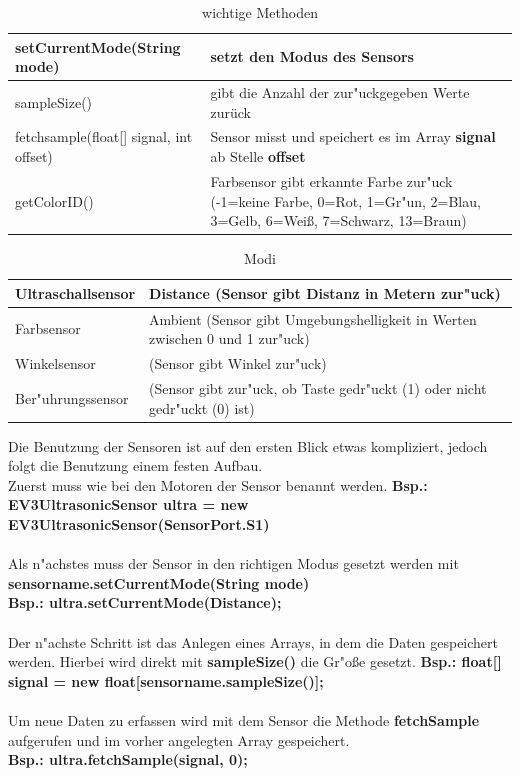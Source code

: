 \begin{table}[H]
	\begin{tabular}{|p{}| p{}|}
		\hline
		setCurrentMode\newline (String mode)& setzt den Modus des Sensors \\ \hline 
		sampleSize() &  gibt die Anzahl der zur"uckgegeben Werte zurück\\ \hline 
		fetchsample(float[] signal, int offset) & Sensor misst und speichert es im Array \textbf{signal} ab Stelle \textbf{offset}\\ \hline
		getColorID() &  Farbsensor gibt erkannte Farbe zur"uck (-1=keine Farbe, 0=Rot, 1=Gr"un, 2=Blau, 3=Gelb, 6=Wei\ss{}, 7=Schwarz, 13=Braun)\\ \hline 
	\end{tabular}
	\caption{wichtige Methoden}
\end{table}

\begin{table}[H]
	\begin{tabular}{|p{}| p{}|}
		\hline
		Ultraschallsensor& Distance (Sensor gibt Distanz in Metern zur"uck) \\ \hline 
		Farbsensor &  Ambient (Sensor gibt Umgebungshelligkeit in Werten zwischen 0 und 1 zur"uck)\\ \hline 
		Winkelsensor& (Sensor gibt Winkel zur"uck)\\ \hline
		Ber"uhrungssensor& (Sensor gibt zur"uck, ob Taste gedr"uckt (1) oder nicht gedr"uckt (0) ist)\\ \hline
	\end{tabular}
	\caption{Modi}
\end{table}

Die Benutzung der Sensoren ist auf den ersten Blick etwas kompliziert, jedoch folgt die Benutzung einem festen Aufbau.\\

Zuerst muss wie bei den Motoren der Sensor benannt werden.\newline
\textbf{Bsp.: EV3UltrasonicSensor ultra = new EV3UltrasonicSensor(SensorPort.S1)}\\ \\
Als n"achstes muss der Sensor in den richtigen Modus gesetzt werden mit \newline \textbf{sensorname.setCurrentMode(String mode)}\\
\textbf{Bsp.: ultra.setCurrentMode(\glqq Distance\grqq{});}
\\ \\
Der n"achste Schritt ist das Anlegen eines Arrays, in dem die Daten gespeichert werden. Hierbei wird direkt mit \textbf{sampleSize()} die Gr"o\ss{}e gesetzt.
\textbf{Bsp.: float[] signal = new float[sensorname.sampleSize()];}
\\ \\
Um neue Daten zu erfassen wird mit dem Sensor die Methode \textbf{fetchSample} aufgerufen und im vorher angelegten Array gespeichert.\\
\textbf{Bsp.: ultra.fetchSample(signal, 0);}

